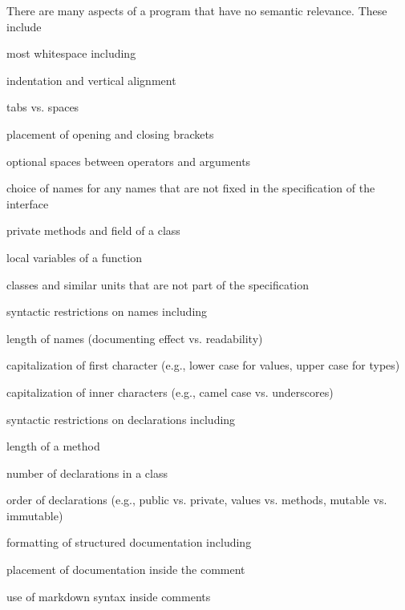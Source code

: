 There are many aspects of a program that have no semantic relevance.
These include
\begin{compactitem}
 \item most whitespace including
   \begin{compactitem}
    \item indentation and vertical alignment
    \item tabs vs. spaces
    \item placement of opening and closing brackets
    \item optional spaces between operators and arguments
   \end{compactitem}
  \item choice of names for any names that are not fixed in the specification of the interface
    \begin{compactitem}
     \item private methods and field of a class
     \item local variables of a function
     \item classes and similar units that are not part of the specification
    \end{compactitem}
  \item syntactic restrictions on names including
   \begin{compactitem}
     \item length of names (documenting effect vs. readability)
     \item capitalization of first character (e.g., lower case for values, upper case for types)
     \item capitalization of inner characters (e.g., camel case vs. underscores)
   \end{compactitem}
  \item syntactic restrictions on declarations including
   \begin{compactitem}
     \item length of a method
     \item number of declarations in a class
     \item order of declarations (e.g., public vs. private, values vs. methods, mutable vs. immutable)
   \end{compactitem}
  \item formatting of structured documentation including
   \begin{compactitem}
     \item placement of documentation inside the comment
     \item use of markdown syntax inside comments

\end{compactitem}
\end{compactitem}
